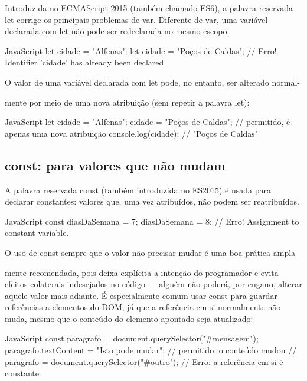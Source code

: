 Introduzida no ECMAScript 2015 (também chamado ES6), a palavra reservada let corrige os principais problemas de var. Diferente de var, uma variável declarada com let não pode ser redeclarada no mesmo escopo:

\begin{codebox}{JavaScript}
let cidade = "Alfenas";
let cidade = "Poços de Caldas"; // Erro! Identifier 'cidade' has already been declared



 O valor de uma variável declarada com let pode, no entanto, ser alterado normal-
\end{codebox}

mente por meio de uma nova atribuição (sem repetir a palavra let):

\begin{codebox}{JavaScript}
let cidade = "Alfenas";
cidade = "Poços de Caldas"; // permitido, é apenas uma nova atribuição
console.log(cidade); // "Poços de Caldas"
\end{codebox}

\subsection{const: para valores que não mudam}

A palavra reservada const (também introduzida no ES2015) é usada para declarar constantes: valores que, uma vez atribuídos, não podem ser reatribuídos.

\begin{codebox}{JavaScript}
const diasDaSemana = 7;
diasDaSemana = 8; // Erro! Assignment to constant variable.

   O uso de const sempre que o valor não precisar mudar é uma boa prática ampla-
\end{codebox}

mente recomendada, pois deixa explícita a intenção do programador e evita efeitos colaterais indesejados no código — alguém não poderá, por engano, alterar aquele valor mais adiante. É especialmente comum usar const para guardar referências a elementos do DOM, já que a referência em si normalmente não muda, mesmo que o conteúdo do elemento apontado seja atualizado:

\begin{codebox}{JavaScript}
const paragrafo = document.querySelector("#mensagem");
paragrafo.textContent = "Isto pode mudar";      // permitido: o conteúdo mudou
// paragrafo = document.querySelector("#outro"); // Erro: a referência em si é constante
\end{codebox}

